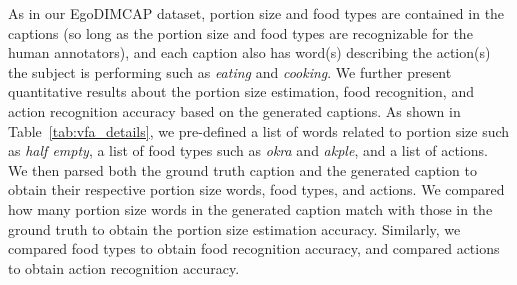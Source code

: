 \documentclass[journal]{IEEEtran}
\begin{document}
\begin{table}[t]
\centering
\caption{Results of the Ablation Studies on Split I}
\label{tab:abl_study}

\end{table}








As in our EgoDIMCAP dataset, portion size and food types are contained in the captions (so long as the portion size and food types are recognizable for the human annotators), and each caption also has word(s) describing the action(s) the subject is performing such as \textit{eating} and \textit{cooking}. We further present quantitative results about the portion size estimation, food recognition, and action recognition accuracy based on the generated captions. As shown in Table~\ref{tab:vfa_details}, we pre-defined a list of words related to portion size such as \textit{half empty}, a list of food types such as \textit{okra} and \textit{akple}, and a list of actions. We then parsed both the ground truth caption and the generated caption to obtain their respective portion size words, food types, and actions. We compared how many portion size words in the generated caption match with those in the ground truth to obtain the portion size estimation accuracy. Similarly, we compared food types to obtain food recognition accuracy, and compared actions to obtain action recognition accuracy.
\end{document}
